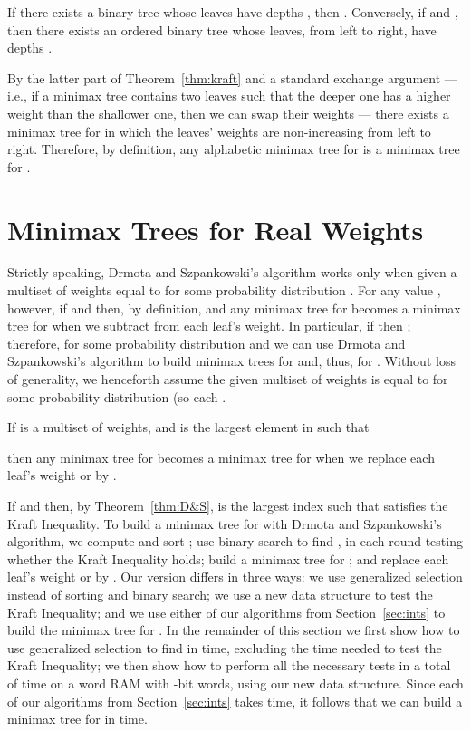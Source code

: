 \documentclass[runningheads]{llncs}
\begin{document}
\begin{theorem}[Kraft, 1949] \label{thm:kraft}
If there exists a binary tree whose leaves have depths , then .  Conversely, if  and , then there exists an ordered binary tree whose leaves, from left to right, have depths .
\end{theorem}

\noindent By the latter part of Theorem~\ref{thm:kraft} and a standard exchange argument --- i.e., if a minimax tree contains two leaves such that the deeper one has a higher weight than the shallower one, then we can swap their weights --- there exists a minimax tree for  in which the leaves' weights are non-increasing from left to right.  Therefore, by definition, any alphabetic minimax tree for  is a minimax tree for .

\section{Minimax Trees for Real Weights} \label{sec:reals}

Strictly speaking, Drmota and Szpankowski's algorithm works only when given a multiset of weights equal to  for some probability distribution .  For any value , however, if  and  then, by definition,  and any minimax tree for  becomes a minimax tree for  when we subtract  from each leaf's weight.  In particular, if  then ; therefore,  for some probability distribution  and we can use Drmota and Szpankowski's algorithm to build minimax trees for  and, thus, for .  Without loss of generality, we henceforth assume the given multiset  of weights is equal to  for some probability distribution  (so each .

\begin{theorem} \label{thm:D&S}
If  is a multiset of weights,  and  is the largest element in  such that

then any minimax tree for  becomes a minimax tree for  when we replace each leaf's weight  or  by .
\end{theorem}

If  and  then, by Theorem~\ref{thm:D&S},  is the largest index such that  satisfies the Kraft Inequality.  To build a minimax tree for  with Drmota and Szpankowski's algorithm, we compute and sort ; use binary search to find , in each round testing whether the Kraft Inequality holds; build a minimax tree for  ; and replace each leaf's weight  or  by .  Our version differs in three ways: we use generalized selection instead of sorting and binary search; we use a new data structure to test the Kraft Inequality; and we use either of our algorithms from Section~\ref{sec:ints} to build the minimax tree for .  In the remainder of this section we first show how to use generalized selection to find  in  time, excluding the time needed to test the Kraft Inequality; we then show how to perform all the necessary tests in a total of  time on a word RAM with -bit words, using our new data structure.  Since each of our algorithms from Section~\ref{sec:ints} takes  time, it follows that we can build a minimax tree for  in  time.
\end{document}
